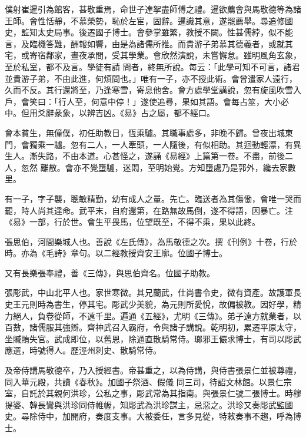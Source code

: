 \begin{pinyinscope}
 僕射崔暹引為館客，甚敬重焉，命世子達挐盡師傅之禮。暹欲薦會與馬敬德等為諸王師。會性恬靜，不慕榮勢，恥於左宦，固辭。暹識其意，遂罷薦舉。尋追修國史，監知太史局事。後遷國子博士。會參掌雖繁，教授不闕。性甚儒綍，似不能言，及臨機答難，酬報如響，由是為諸儒所推。而貴游子弟慕其德義者，或就其宅，或寄宿鄰家，晝夜承間，受其學業。會欣然演說，未嘗懈怠。雖明風角玄象，至於私室，都不及言。學徒有請
 問者，終無所說。每云：「此學可知不可言，諸君並貴游子弟，不由此進，何煩問也。」唯有一子，亦不授此術。會曾遣家人遠行，久而不反。其行還將至，乃逢寒雪，寄息他舍。會方處學堂講說，忽有旋風吹雪入戶，會笑曰：「行人至，何意中停！」遂使追尋，果如其語。會每占筮，大小必中。但用爻辭彖象，以辨吉凶。《易》占之屬，都不經口。



 會本貧生，無僮僕，初任助教日，恆乘驢。其職事處多，非晚不歸。曾夜出城東門，會獨乘一驢。忽有二人，一人牽頭，一人隨後，有似相助。其迴動輕漂，有異生人。漸失路，不由本道。心甚怪之，遂誦《易經》上篇第一卷。不盡，前後二人，忽然
 離散。會亦不覺墮驢，迷悶，至明始覺。方知墮處乃是郭外，纔去家數里。



 有一子，字子襲，聰敏精勤，幼有成人之量。先亡。臨送者為其傷慟，會唯一哭而罷，時人尚其達命。武平末，自府還第，在路無故馬倒，遂不得語，因暴亡。注《易》一部，行於世。會生平畏馬，位望既至，不得不乘，果以此終。



 張思伯，河間樂城人也。善說《左氏傳》，為馬敬德之次。撰《刊例》十卷，行於時。亦為《毛詩》章句。以二經教授齊安王廓。位國子博士。



 又有長樂張奉禮，善《三傳》，與思伯齊名。位國子助教。



 張彫武，中山北平人也。家世寒微。其兄蘭武，仕尚書令史，微有資產。故護軍長史王元則時為書生，停其宅。彫武少美貌，為元則所愛悅，故偏被教。因好學，精力絕人，負卷從師，不遠千里。遍通《五經》，尤明《三傳》。弟子遠方就業者，以百數，諸儒服其強辯。齊神武召入霸府，令與諸子講說。乾明初，累遷平原太守，坐贓賄失官。武成即位，以舊恩，除通直散騎常侍。瑯邪王儼求博士，有司以彫武應選，時號得人。歷涇州刺史、散騎常侍。



 及帝侍講馬敬德卒，乃入授經書。帝甚重之，以為侍講，與侍書張景仁並被尊禮，同入華元殿，共讀《春秋》。加國子祭酒、假儀
 同三司，待詔文林館。以景仁宗室，自託於其親何洪珍，公私之事，彫武常為其指南。與張景仁號二張博士。時穆提婆、韓長鸞與洪珍同侍帷幄，知彫武為洪珍謀主，忌惡之。洪珍又奏彫武監國史。尋除侍中，加開府，奏度支事。大被委任，言多見從，特敕奏事不趨，呼為博士。




\end{pinyinscope}
